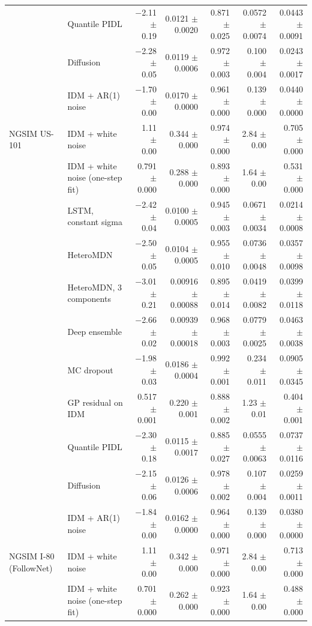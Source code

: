 \begin{longtable}{llrrrrr}
 & Quantile PIDL & $-$2.11 $\pm$ 0.19 & 0.0121 $\pm$ 0.0020 & 0.871 $\pm$ 0.025 & 0.0572 $\pm$ 0.0074 & 0.0443 $\pm$ 0.0091 \\
 & Diffusion & $-$2.28 $\pm$ 0.05 & 0.0119 $\pm$ 0.0006 & 0.972 $\pm$ 0.003 & 0.100 $\pm$ 0.004 & 0.0243 $\pm$ 0.0017 \\
 & IDM + AR(1) noise & $-$1.70 $\pm$ 0.00 & 0.0170 $\pm$ 0.0000 & 0.961 $\pm$ 0.000 & 0.139 $\pm$ 0.000 & 0.0440 $\pm$ 0.0000 \\
\midrule
NGSIM US-101 & IDM + white noise & 1.11 $\pm$ 0.00 & 0.344 $\pm$ 0.000 & 0.974 $\pm$ 0.000 & 2.84 $\pm$ 0.00 & 0.705 $\pm$ 0.000 \\
 & IDM + white noise (one-step fit) & 0.791 $\pm$ 0.000 & 0.288 $\pm$ 0.000 & 0.893 $\pm$ 0.000 & 1.64 $\pm$ 0.00 & 0.531 $\pm$ 0.000 \\
 & LSTM, constant sigma & $-$2.42 $\pm$ 0.04 & 0.0100 $\pm$ 0.0005 & 0.945 $\pm$ 0.003 & 0.0671 $\pm$ 0.0034 & 0.0214 $\pm$ 0.0008 \\
 & HeteroMDN & $-$2.50 $\pm$ 0.05 & 0.0104 $\pm$ 0.0005 & 0.955 $\pm$ 0.010 & 0.0736 $\pm$ 0.0048 & 0.0357 $\pm$ 0.0098 \\
 & HeteroMDN, 3 components & $-$3.01 $\pm$ 0.21 & 0.00916 $\pm$ 0.00088 & 0.895 $\pm$ 0.014 & 0.0419 $\pm$ 0.0082 & 0.0399 $\pm$ 0.0118 \\
 & Deep ensemble & $-$2.66 $\pm$ 0.02 & 0.00939 $\pm$ 0.00018 & 0.968 $\pm$ 0.003 & 0.0779 $\pm$ 0.0025 & 0.0463 $\pm$ 0.0038 \\
 & MC dropout & $-$1.98 $\pm$ 0.03 & 0.0186 $\pm$ 0.0004 & 0.992 $\pm$ 0.001 & 0.234 $\pm$ 0.011 & 0.0905 $\pm$ 0.0345 \\
 & GP residual on IDM & 0.517 $\pm$ 0.001 & 0.220 $\pm$ 0.001 & 0.888 $\pm$ 0.002 & 1.23 $\pm$ 0.01 & 0.404 $\pm$ 0.001 \\
 & Quantile PIDL & $-$2.30 $\pm$ 0.18 & 0.0115 $\pm$ 0.0017 & 0.885 $\pm$ 0.027 & 0.0555 $\pm$ 0.0063 & 0.0737 $\pm$ 0.0116 \\
 & Diffusion & $-$2.15 $\pm$ 0.06 & 0.0126 $\pm$ 0.0006 & 0.978 $\pm$ 0.002 & 0.107 $\pm$ 0.004 & 0.0259 $\pm$ 0.0011 \\
 & IDM + AR(1) noise & $-$1.84 $\pm$ 0.00 & 0.0162 $\pm$ 0.0000 & 0.964 $\pm$ 0.000 & 0.139 $\pm$ 0.000 & 0.0380 $\pm$ 0.0000 \\
\midrule
NGSIM I-80 (FollowNet) & IDM + white noise & 1.11 $\pm$ 0.00 & 0.342 $\pm$ 0.000 & 0.971 $\pm$ 0.000 & 2.84 $\pm$ 0.00 & 0.713 $\pm$ 0.000 \\
 & IDM + white noise (one-step fit) & 0.701 $\pm$ 0.000 & 0.262 $\pm$ 0.000 & 0.923 $\pm$ 0.000 & 1.64 $\pm$ 0.00 & 0.488 $\pm$ 0.000 \\

\end{longtable}

